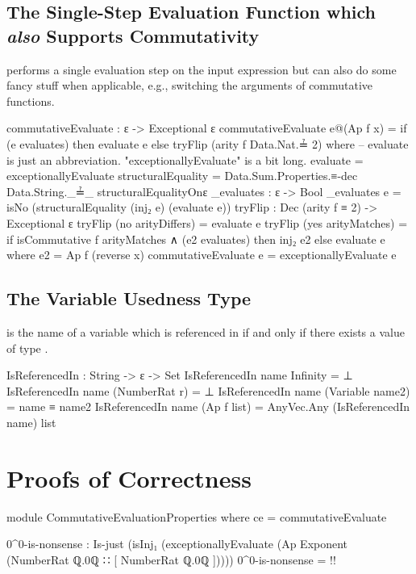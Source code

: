 \documentclass{report}
\begin{document}
\section{The Single-Step Evaluation Function which \emph{also} Supports Commutativity}
  performs a single evaluation step on the input expression but can also do some fancy stuff when applicable, e.g., switching the arguments of commutative functions.

\begin{code}
commutativeEvaluate : ε -> Exceptional ε
commutativeEvaluate e@(Ap f x) =
  if (e evaluates) then evaluate e else tryFlip (arity f Data.Nat.≟ 2)
  where
  -- evaluate is just an abbreviation.  "exceptionallyEvaluate" is a bit long.
  evaluate = exceptionallyEvaluate
  structuralEquality =
    Data.Sum.Properties.≡-dec Data.String._≟_ structuralEqualityOnε
  _evaluates : ε -> Bool
  _evaluates e = isNo (structuralEquality (inj₂ e) (evaluate e))
  tryFlip : Dec (arity f ≡ 2) -> Exceptional ε
  tryFlip (no arityDiffers) = evaluate e
  tryFlip (yes arityMatches) =
    if isCommutative f arityMatches ∧ (e2 evaluates) then inj₂ e2 else evaluate e
    where e2 = Ap f (reverse x)
commutativeEvaluate e = exceptionallyEvaluate e
\end{code}

\section{The Variable Usedness Type}
 is the name of a variable which is referenced in  if and only if there exists a value of type   .

\begin{code}
IsReferencedIn : String -> ε -> Set
IsReferencedIn name Infinity = ⊥
IsReferencedIn name (NumberRat r) = ⊥
IsReferencedIn name (Variable name2) = name ≡ name2
IsReferencedIn name (Ap f list) = AnyVec.Any (IsReferencedIn name) list
\end{code}

\chapter{Proofs of Correctness}

\begin{code}
module CommutativeEvaluationProperties where
  ce = commutativeEvaluate

  0^0-is-nonsense :
    Is-just (isInj₁ (exceptionallyEvaluate
      (Ap Exponent (NumberRat ℚ.0ℚ ∷ [ NumberRat ℚ.0ℚ ]))))
  0^0-is-nonsense = {!!}
\end{code}
\end{document}
